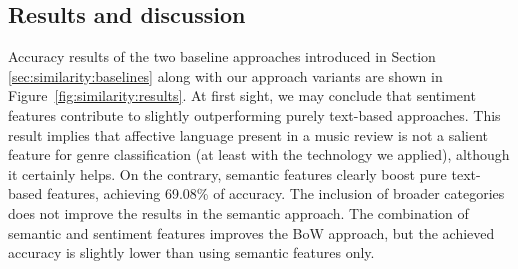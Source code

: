 

\subsection{Results and discussion}
\label{sec:similarity:class:results}

Accuracy results of the two baseline approaches introduced in Section \ref{sec:similarity:baselines} along with our approach variants are shown in Figure~\ref{fig:similarity:results}. At first sight, we may conclude that sentiment features contribute to slightly outperforming purely text-based approaches. This result implies that affective language present in a music review is not a salient feature for genre classification (at least with the technology we applied), although it certainly helps. On the contrary, semantic features clearly boost pure text-based features, achieving 69.08\% of accuracy. The inclusion of broader categories does not improve the results in the semantic approach. The combination of semantic and sentiment features improves the BoW approach, but the achieved accuracy is slightly lower than using semantic features only.%

